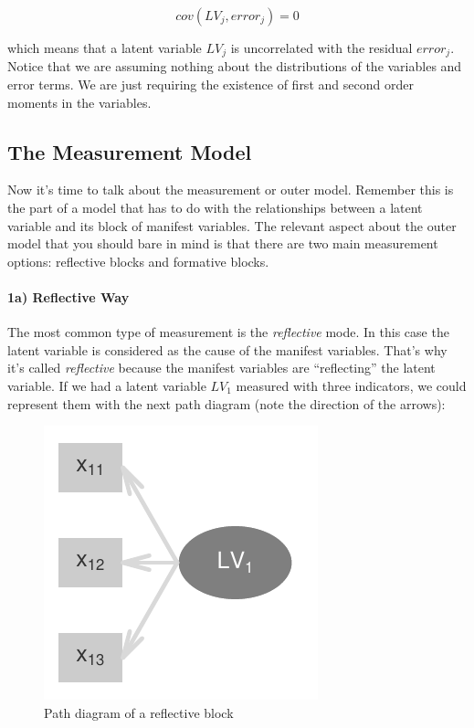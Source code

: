 \documentclass[12pt]{book}\usepackage{graphicx, color}
\newenvironment{knitrout}{}{} %
\begin{document}
$$ cov(LV_j, error_j) = 0 $$

which means that a latent variable $LV_j$ is uncorrelated with the residual $error_j$. Notice that we are assuming nothing about the distributions of the variables and error terms. We are just requiring the existence of first and second order moments in the variables.



\subsection{The Measurement Model}
Now it's time to talk about the measurement or outer model. Remember this is the part of a model that has to do with the relationships between a latent variable and its block of manifest variables. The relevant aspect about the outer model that you should bare in mind is that there are two main measurement options: reflective blocks and formative blocks. 

\paragraph{1a) Reflective Way}
The most common type of measurement is the \textit{reflective} mode. In this case the latent variable is considered as the cause of the manifest variables. That's why it's called \textit{reflective} because the manifest variables are ``reflecting'' the latent variable. If we had a latent variable $LV_1$ measured with three indicators, we could represent them with the next path diagram (note the direction of the arrows):
\begin{knitrout}
\color{fgcolor}\begin{figure}[h]


{\centering \includegraphics[width=.25\linewidth,height=.25\linewidth]{figure/reflective_way} 

}

\caption[Path diagram of a reflective block]{Path diagram of a reflective block\label{fig:reflective_way}}
\end{figure}


\end{knitrout}
\end{document}
